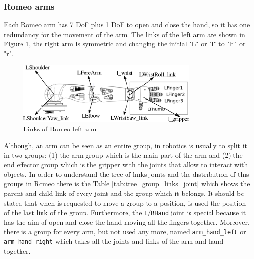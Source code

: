 \documentclass[12pt,a4paper,final,twoside,openright]{report}
\begin{document}
\subsubsection{Romeo arms}

Each Romeo arm has 7 DoF plus 1 DoF to open and close the hand, so it has one redundancy for the movement of the arm. The links of the left arm are shown in Figure \ref{fig:romeo_arm}, the right arm is symmetric and changing the initial "L" or "l" to "R" or "r".

\begin{figure}[h]
\centering
\includegraphics[width=0.8\textwidth]{images/arm_link.eps}
\caption{Links of Romeo left arm \cite{Aldebaran}\label{fig:romeo_arm}}
\end{figure}

Although, an arm can be seen as an entire group, in robotics is usually to split it in two groups: (1) the arm group which is the main part of the arm and (2) the end effector group which is the gripper with the joints that allow to interact with objects. In order to understand the tree of links-joints and the distribution of this groups in Romeo there is the Table \ref{tab:tree_group_links_joint} which shows the parent and child link of every joint and the group which it belongs. It should be stated that when is requested to move a group to a position, is used the position of the last link of the group. Furthermore, the \texttt{L$/$RHand} joint is special because it has the aim of open and close the hand moving all the fingers together. Moreover, there is a group for every arm, but not used any more, named \texttt{arm\_hand\_left} or \texttt{arm\_hand\_right} which takes all the joints and links of the arm and hand together.
\end{document}
